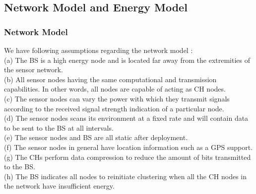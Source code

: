 \documentclass[11pt]{report}
\begin{document}


	\subsection{Network Model and Energy Model}
	\subsubsection{Network Model}
	We have following assumptions regarding the network model \cite{article} \cite{7763028}:\\
	(a) The BS is a high energy node and is located far away from the extremities of the sensor network.\\
	(b) All sensor nodes having the same computational and transmission capabilities. In other words, all nodes are capable of acting as CH nodes.\\
	(c) The sensor nodes can vary the power with which they transmit signals according to the received signal strength indication of a particular node.\\
	(d) The sensor nodes scans its environment at a fixed rate and will contain data to be sent to the BS at all intervals.\\
	(e) The sensor nodes and BS are all static after deployment.\\
	(f) The sensor nodes in general have location information such as a GPS support.\\
	(g) The CHs perform data compression to reduce the amount of bits transmitted to the BS.\\
	(h) The BS indicates all nodes to reinitiate clustering when all the CH nodes in the network have insufficient energy.
	
\end{document}
